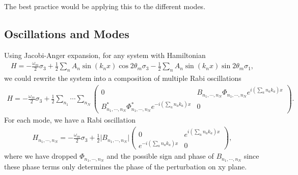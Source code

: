 \documentclass[letterpaper,12pt,english]{sphinxmanual}
\begin{document}
The best practice would be applying this to the different modes.


\subsection{Oscillations and Modes}
\label{\detokenize{matter-stimulated/picture:oscillations-and-modes}}
Using Jacobi-Anger expansion, for any system with Hamiltonian
\begin{equation*}
\begin{split}H = -\frac{\omega_m}{2} \sigma_3 + \frac{1}{2}\sum_n A_n \sin (k_n x) \cos 2\theta_m \sigma_3 - \frac{1}{2}\sum_n A_n \sin (k_n x) \sin 2\theta_m \sigma_1,\end{split}
\end{equation*}
we could rewrite the system into a composition of multiple Rabi oscillations
\begin{equation*}
\begin{split}H = -\frac{\omega_m}{2} \sigma_3 + \frac{1}{2} \sum_{n_1} \cdots \sum_{n_N} \begin{pmatrix} 0 & B_{n_1,\cdots,n_N} \Phi_{n_1,\cdots, n_N} e^{i \left( \sum_{a} n_a k_a   \right)x} \\ B_{n_1,\cdots,n_N}^* \Phi_{n_1,\cdots, n_N}^* e^{-i \left( \sum_{a} n_a k_a   \right)x} & 0 \end{pmatrix}.\end{split}
\end{equation*}
For each mode, we have a Rabi oscillation
\begin{equation*}
\begin{split}H_{n_1,\cdots,n_N} =  -\frac{\omega_m}{2} \sigma_3 + \frac{1}{2}
\lvert B_{n_1,\cdots,n_N} \rvert \begin{pmatrix}
0 & e^{i \left( \sum_{a} n_a k_a   \right)x} \\
e^{-i \left( \sum_{a} n_a k_a   \right)x} &  0
\end{pmatrix},\end{split}
\end{equation*}
where we have dropped \(\Phi_{n_1,\cdots, n_N}\) and the possible sign and phase of \(B_{n_1,\cdots,n_N}\) since these phase terms only determines the phase of the perturbation on xy plane.
\end{document}
